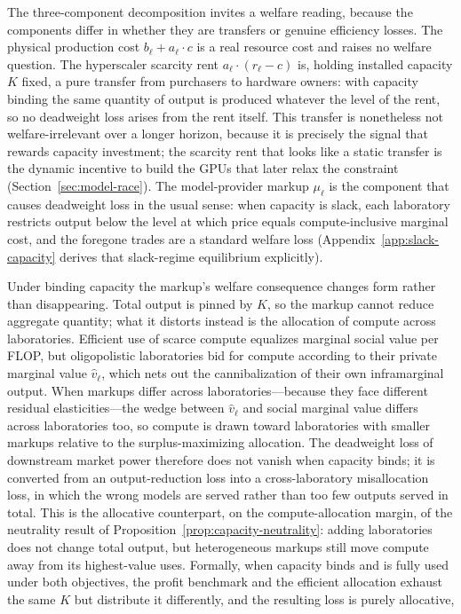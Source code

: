 \documentclass[11pt]{article}
\begin{document}
The three-component decomposition invites a welfare reading, because the components differ in whether they are transfers or genuine efficiency losses. The physical production cost $b_\ell+a_\ell\cdot c$ is a real resource cost and raises no welfare question. The hyperscaler scarcity rent $a_\ell\cdot(r_\ell-c)$ is, holding installed capacity $K$ fixed, a pure transfer from purchasers to hardware owners: with capacity binding the same quantity of output is produced whatever the level of the rent, so no deadweight loss arises from the rent itself. This transfer is nonetheless not welfare-irrelevant over a longer horizon, because it is precisely the signal that rewards capacity investment; the scarcity rent that looks like a static transfer is the dynamic incentive to build the GPUs that later relax the constraint (Section~\ref{sec:model-race}). The model-provider markup $\mu_\ell$ is the component that causes deadweight loss in the usual sense: when capacity is slack, each laboratory restricts output below the level at which price equals compute-inclusive marginal cost, and the foregone trades are a standard welfare loss (Appendix~\ref{app:slack-capacity} derives that slack-regime equilibrium explicitly).

Under binding capacity the markup's welfare consequence changes form rather than disappearing. Total output is pinned by $K$, so the markup cannot reduce aggregate quantity; what it distorts instead is the allocation of compute across laboratories. Efficient use of scarce compute equalizes marginal social value per FLOP, but oligopolistic laboratories bid for compute according to their private marginal value $\widehat v_\ell$, which nets out the cannibalization of their own inframarginal output. When markups differ across laboratories---because they face different residual elasticities---the wedge between $\widehat v_\ell$ and social marginal value differs across laboratories too, so compute is drawn toward laboratories with smaller markups relative to the surplus-maximizing allocation. The deadweight loss of downstream market power therefore does not vanish when capacity binds; it is converted from an output-reduction loss into a cross-laboratory misallocation loss, in which the wrong models are served rather than too few outputs served in total. This is the allocative counterpart, on the compute-allocation margin, of the neutrality result of Proposition~\ref{prop:capacity-neutrality}: adding laboratories does not change total output, but heterogeneous markups still move compute away from its highest-value uses. Formally, when capacity binds and is fully used under both objectives, the profit benchmark and the efficient allocation exhaust the same $K$ but distribute it differently, and the resulting loss is purely allocative,
\end{document}
